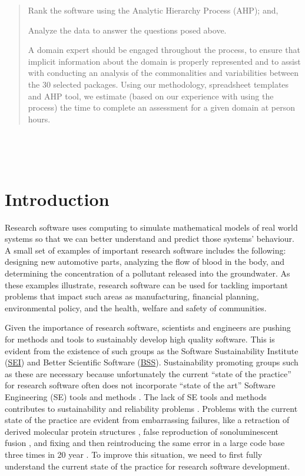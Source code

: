 \documentclass[letterpaper,cleveref]{lipics-v2019}
\newcounter{totHours} %
\begin{document}
\begin{abstract}
\begin{inparaenum}[i)]
    \item Rank the software using the Analytic Hierarchy Process (AHP); and,
    \item Analyze the data to answer the questions posed above.
  \end{inparaenum}
  A domain expert should be engaged throughout the process, to ensure that
  implicit information about the domain is properly represented and to assist
  with conducting an analysis of the commonalities and variabilities between the
  30 selected packages.  Using our methodology, spreadsheet templates and AHP
  tool, we estimate (based on our experience with using the process) the time to
  complete an assessment for a given domain at  person hours.
\end{abstract}

~\newpage

\tableofcontents

~\newpage

\section{Introduction} \label{SecIntroduction}

Research software uses computing to simulate mathematical models of real world
systems so that we can better understand and predict those systems' behaviour.  A
small set of examples of important research software includes the
following: designing new automotive parts, analyzing the flow of blood in the
body, and determining the concentration of a pollutant released into the
groundwater.  As these examples illustrate, research software can be used for
tackling important problems that impact such areas as manufacturing, financial
planning, environmental policy, and the health, welfare and safety of
communities.

Given the importance of research software, scientists and engineers are pushing
for methods and tools to sustainably develop high quality software.  This is
evident from the existence of such groups as the Software Sustainability
Institute (\href{https://www.software.ac.uk/} {SEI}) and Better Scientific
Software (\href{https://bssw.io/} {BSS}).  Sustainability promoting groups such
as these are necessary because unfortunately the current ``state of the
practice'' for research software often does not incorporate ``state of the art''
Software Engineering (SE) tools and methods \citep{JohansonAndHasselbring2018}.
The lack of SE tools and methods contributes to sustainability and reliability
problems \citep{FaulkEtAl2009}.  Problems with the current state of the practice
are evident from embarrassing failures, like a retraction of derived molecular
protein structures \citep{Miller2006}, false reproduction of sonoluminescent
fusion \citep{PostAndVotta2005}, and fixing and then reintroducing the same
error in a large code base three times in 20 year
\citep{MilewiczAndRaybourn2018}.  To improve this situation, we need to first
fully understand the current state of the practice for research software
development.
\end{document}

